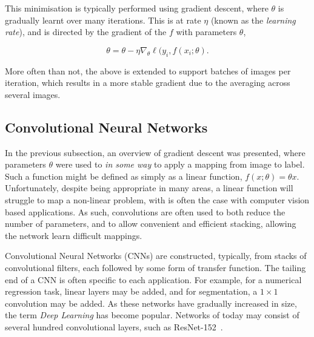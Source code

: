 \noindent This minimisation is typically performed using gradient
descent, where $\theta$ is gradually learnt over many iterations. This
is at rate $\eta$ (known as the \textit{learning rate}), and is
directed by the gradient of the $f$ with parameters $\theta$,

\begin{equation}
  \theta = \theta - \eta \nabla_\theta \ell(y_i, f(x_i ; \theta) .
\end{equation}

More often than not, the above is extended to support batches of
images per iteration, which results in a more stable gradient due to
the averaging across several images.

\subsection{Convolutional Neural Networks}

In the previous subsection, an overview of gradient descent was
presented, where parameters $\theta$ were used to \textit{in some way}
to apply a mapping from image to label. Such a function might be
defined as simply as a linear function, $f(x;\theta) = \theta
x$. Unfortunately, despite being appropriate in many areas, a linear
function will struggle to map a non-linear problem, with is often the
case with computer vision based applications. As such, convolutions
are often used to both reduce the number of parameters, and to allow
convenient and efficient stacking, allowing the network learn
difficult mappings.

Convolutional Neural Networks (CNNs) are constructed, typically, from
stacks of convolutional filters, each followed by some form of
transfer function. The tailing end of a CNN is often specific to each
application. For example, for a numerical regression task, linear
layers may be added, and for segmentation, a $1\times 1$ convolution
may be added. As these networks have gradually increased in size, the
term \textit{Deep Learning} has become popular. Networks of today may
consist of several hundred convolutional layers, such as
ResNet-152~\cite{he2015deep}.


